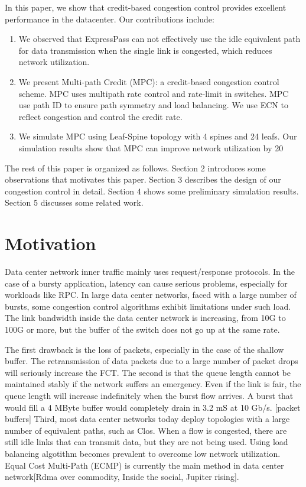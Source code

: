 \documentclass[conference,compsoc]{IEEEtran}
\begin{document}
In this paper, we show that credit-based congestion control provides excellent performance in the datacenter. Our contributions include:
\begin{enumerate}
  \item We observed that ExpressPass can not effectively use the idle equivalent path for data transmission when the single link is congested, which reduces network utilization.
  \item We present Multi-path Credit (MPC): a credit-based congestion control scheme. MPC uses multipath rate control and rate-limit in switches. MPC use path ID to ensure path symmetry and load balancing. We use ECN to reflect congestion and control the credit rate.
  \item We simulate MPC using Leaf-Spine topology with 4 spines and 24 leafs. Our simulation results show that MPC can improve network utilization by 20%
\end{enumerate}

The rest of this paper is organized as follows. Section 2 introduces some observations that motivates this paper. Section 3 describes the design of our congestion control in detail. Section 4 shows some preliminary simulation results. Section 5 discusses some related work.


\section{Motivation}
Data center network inner traffic mainly uses request/response protocols. In the case of a bursty application, latency can cause serious problems, especially for workloads like RPC. In large data center networks, faced with a large number of bursts, some congestion control algorithms exhibit limitations under such load. The link bandwidth inside the data center network is increasing, from 10G to 100G or more, but the buffer of the switch does not go up at the same rate.

The first drawback is the loss of packets, especially in the case of the shallow buffer. The retransmission of data packets due to a large number of packet drops will seriously increase the FCT. The second is that the queue length cannot be maintained stably if the network suffers an emergency. Even if the link is fair, the queue length will increase indefinitely when the burst flow arrives. A burst that would fill a 4 MByte buffer would completely drain in 3.2 mS at 10 Gb/s. [packet buffers] Third, most data center networks today deploy topologies with a large number of equivalent paths, such as Clos. When a flow is congested, there are still idle links that can transmit data, but they are not being used. Using load balancing algotithm becomes prevalent to overcome low network utilization. Equal Cost Multi-Path (ECMP) is currently the main method in data center network[Rdma over commodity, Inside the social, Jupiter rising].
\end{document}
